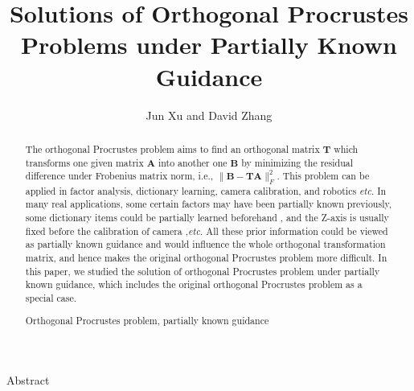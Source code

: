 \documentclass[titlepage,11pt,twoside]{article}
\begin{document}

\title{Solutions of Orthogonal Procrustes Problems under Partially Known Guidance}

\author{Jun Xu and David Zhang }






\begin{center}\vskip3pt


\vspace{32pt}

Abstract\vskip3pt

\end{center}


\begin{abstract}
The orthogonal Procrustes problem aims to find an orthogonal matrix $\mathbf{T}$ which transforms one given matrix $\mathbf{A}$ into another one $\mathbf{B}$ by minimizing the residual difference under Frobenius matrix norm, i.e., $\|\mathbf{B}-\mathbf{T}\mathbf{A}\|_{F}^{2}$. This problem can be applied in factor analysis, dictionary learning, camera calibration, and robotics \emph{etc}. In many real applications, some certain factors may have been partially known previously, some dictionary items could be partially learned beforehand \cite{aharon2006img}, and the Z-axis is usually fixed before the calibration of camera \cite{zhang2000flexible},\emph{etc}. All these prior information could be viewed as partially known guidance and would influence the whole orthogonal transformation matrix, and hence makes the original orthogonal Procrustes problem more difficult. In this paper, we studied the solution of orthogonal Procrustes problem under partially known guidance, which includes the original orthogonal Procrustes problem as a special case.
\begin{keywords}
Orthogonal Procrustes problem, partially known guidance
\end{keywords}
\end{abstract}
\end{document}
